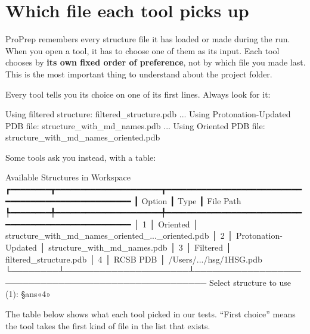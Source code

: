 \section{Which file each tool picks up}\label{sec:projectfolder-pickup}

ProPrep remembers every structure file it has loaded or made during the run.
When you open a tool, it has to choose one of them as its input. Each tool
chooses by \textbf{its own fixed order of preference}, not by which file you made
last. This is the most important thing to understand about the project folder.

Every tool tells you its choice on one of its first lines. Always look for it:

\begin{screen}
Using filtered structure: filtered_structure.pdb
...
Using Protonation-Updated PDB file: structure_with_md_names.pdb
...
Using Oriented PDB file: structure_with_md_names_oriented.pdb
\end{screen}

Some tools ask you instead, with a table:

\begin{screen}
          Available Structures in Workspace
┏━━━━━━━━┳━━━━━━━━━━━━━━━━━━━━━┳━━━━━━━━━━━━━━━━━━━━━━━━━━━━━━━━━━━━━━━━━━━━━━━━━━━━
┃ Option ┃ Type                ┃ File Path
┡━━━━━━━━╇━━━━━━━━━━━━━━━━━━━━━╇━━━━━━━━━━━━━━━━━━━━━━━━━━━━━━━━━━━━━━━━━━━━━━━━━━━━
│   1    │ Oriented            │ structure_with_md_names_oriented_..._oriented.pdb
│   2    │ Protonation-Updated │ structure_with_md_names.pdb
│   3    │ Filtered            │ filtered_structure.pdb
│   4    │ RCSB PDB            │ /Users/.../hsg/1HSG.pdb
└────────┴─────────────────────┴────────────────────────────────────────────────────
Select structure to use (1): §ans«4»
\end{screen}

The table below shows what each tool picked in our tests. ``First choice''
means the tool takes the first kind of file in the list that exists.

